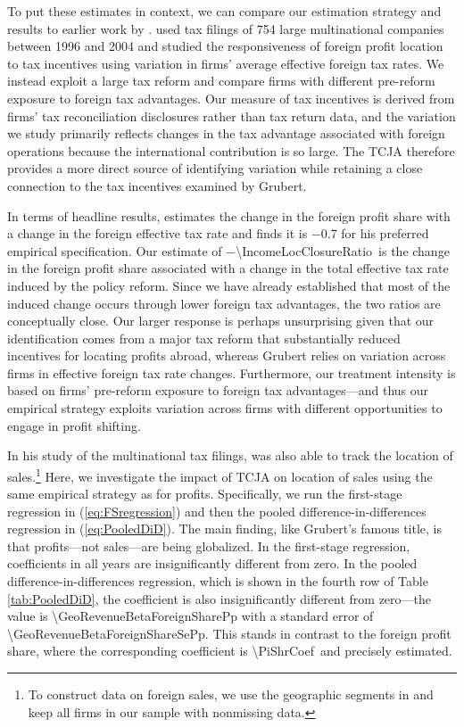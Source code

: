 \documentclass[11pt,letterpaper]{article}
\newcommand{\CoefNum}[1]{\num[round-mode=places,round-precision=3]{#1}}
\newcommand{\RatioNum}[1]{\num[round-mode=places,round-precision=2]{#1}}
\begin{document}
To put these estimates in context, we can compare our estimation strategy
and results to earlier work by \citet{Grubert2012}.
\citet{Grubert2012} used tax filings of  754 large multinational companies
between 1996 and 2004 and  studied the responsiveness of foreign profit location 
to tax incentives using variation in firms' average effective foreign tax rates. 
We instead exploit a large tax reform and compare firms with different
pre-reform exposure to foreign tax advantages. 
Our measure of tax incentives is derived from firms' tax reconciliation disclosures 
rather than tax return data,  and the variation we 
study primarily reflects changes in the tax advantage associated 
with foreign operations because the international contribution is so large.
The TCJA therefore provides a more direct source of 
identifying variation while retaining a close connection to the tax incentives 
examined by Grubert.  

In terms of headline results, \citet{Grubert2012} estimates the 
change in the foreign profit share with a change in the foreign effective tax rate
and finds it is $-$0.7  for his preferred empirical specification.
Our estimate of $-$\RatioNum{\IncomeLocClosureRatio}\ is the change in the
foreign profit share associated with 
a change in the total effective tax rate induced by the policy reform.
Since we have already established that most of the induced change occurs
through lower foreign tax advantages, the two ratios are conceptually close.
Our larger response is perhaps unsurprising given that our identification 
comes from a major tax reform that substantially reduced incentives for locating 
profits abroad, whereas Grubert relies on variation across firms in
effective foreign tax rate changes. Furthermore, our treatment intensity is based on firms' 
pre-reform exposure to foreign tax advantages---and thus our empirical
strategy exploits variation across firms with different opportunities to
engage in profit shifting.

In his study of the multinational  tax filings, \citet{Grubert2012} was also able to 
track the location of sales.\footnote{%
To construct data on foreign sales, we use the geographic segments
in \citet{CompustatSegments} and keep all firms in our sample with nonmissing data.}
Here, we investigate the impact of TCJA on location of
sales using the same empirical strategy as for profits. Specifically,
we run the first-stage regression in (\ref{eq:FSregression}) and
then the pooled difference-in-differences regression in (\ref{eq:PooledDiD}).
The main finding, like Grubert's famous title, is that profits---not sales---are
being globalized. 
In the first-stage regression, 
coefficients in all years are insignificantly different from zero.
In the pooled difference-in-differences regression, which is shown in the
fourth row of Table \ref{tab:PooledDiD}, the coefficient is also insignificantly
different from zero---the value 
is \CoefNum{\GeoRevenueBetaForeignSharePp} 
with a standard error of
\CoefNum{\GeoRevenueBetaForeignShareSePp}.
This stands in contrast to the foreign profit share, where the
corresponding coefficient is \CoefNum{\PiShrCoef}\ and precisely
estimated.
\end{document}
